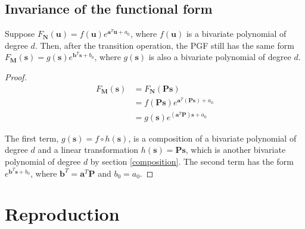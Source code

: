 \documentclass{article}
\begin{document}
\subsection{Invariance of the functional form}
Suppose $F_{\mathbf{N}}(\mathbf{u}) = f(\mathbf{u}) e^{\mathbf{a}^T \mathbf{u} + a_0}$, where $f(\mathbf{u})$ is a bivariate polynomial of degree $d$. Then, after the transition operation, the PGF still has the same form $F_{\mathbf{M}}(\mathbf{s}) = g(\mathbf{s}) e^{\mathbf{b}^T \mathbf{s} + b_0}$, where $g(\mathbf{s})$ is also a bivariate polynomial of degree $d$.

\begin{proof}
\begin{align*}
F_{\mathbf{M}}(\mathbf{s}) &=  F_{\mathbf{N}}(\mathbf{P} \mathbf{s}) \\
&= f(\mathbf{P} \mathbf{s}) e^{\mathbf{a}^T (\mathbf{\mathbf{P} \mathbf{s}}) + a_0} \\
&= g(\mathbf{s}) e^{(\mathbf{a}^T \mathbf{P}) \mathbf{s} + a_0}
\end{align*}

The first term, $g(\mathbf{s}) = f \circ h(\mathbf{s})$, is a composition of a bivariate polynomial of degree $d$ and a linear transformation $h(\mathbf{s}) = \mathbf{P} \mathbf{s}$, which is another bivariate polynomial of degree $d$ by section \ref{composition}. The second term has the form $e^{\mathbf{b}^T \mathbf{s} + b_0}$, where $\mathbf{b}^T = \mathbf{a}^T \mathbf{P}$ and $b_0 = a_0$.

\end{proof}

\section{Reproduction}

\medskip
 


\end{document}

